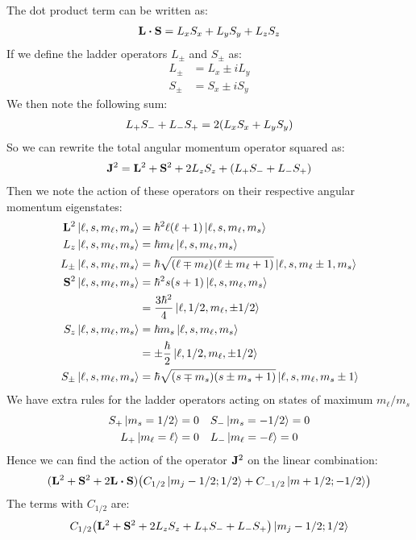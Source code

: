 \documentclass[12pt]{article}
\renewcommand{\l}{\ell}
\begin{document}
The dot product term can be written as:
\begin{align*}
  \vb{L}\vdot\vb{S}=L_xS_x+L_yS_y+L_zS_z
\end{align*}
If we define the ladder operators $L_\pm$ and $S_\pm$ as:
\begin{align*}
  L_\pm&=L_x\pm iL_y\\
  S_\pm&=S_x\pm iS_y
\end{align*}
We then note the following sum:
\begin{align*}
  L_+S_-+L_-S_+=2\qty(L_xS_x+L_yS_y)
\end{align*}
So we can rewrite the total angular momentum operator squared as:
\begin{align*}
  \vb{J}^2=\vb{L}^2+\vb{S}^2+2L_zS_z+\qty(L_+S_-+L_-S_+)
\end{align*}
Then we note the action of these operators on their respective angular momentum eigenstates:
\begin{align*}
  \vb{L}^2\ket{\l,s,m_\l,m_s}&=\hbar^2\l(\l+1)\ket{\l,s,m_\l,m_s}\\
  L_z\ket{\l,s,m_\l,m_s}&=\hbar m_\l\ket{\l,s,m_\l,m_s}\\
  L_\pm\ket{\l,s,m_\l,m_s}&=\hbar
  \sqrt{(\l\mp m_\l)(\l\pm m_\l+1)}\ket{\l,s,m_\l\pm1,m_s}\\
  \vb{S}^2\ket{\l,s,m_\l,m_s}&=\hbar^2s(s+1)\ket{\l,s,m_\l,m_s}\\
  &=\frac{3\hbar^2}4\ket{\l,1/2,m_\l,\pm1/2}\\
  S_z\ket{\l,s,m_\l,m_s}&=\hbar m_s\ket{\l,s,m_\l,m_s}\\
  &=\pm\frac\hbar2\ket{\l,1/2,m_\l,\pm1/2}\\
  S_\pm\ket{\l,s,m_\l,m_s}&=\hbar
  \sqrt{(s\mp m_s)(s\pm m_s+1)}\ket{\l,s,m_\l,m_s\pm1}
\end{align*}
We have extra rules for the ladder operators acting on states of maximum $m_\l/m_s$
\begin{gather*}
  S_+\ket{m_s=1/2}=0\quad S_-\ket{m_s=-1/2}=0\\
  L_+\ket{m_\l=\l}=0\quad L_-\ket{m_\l=-\l}=0
\end{gather*}
Hence we can find the action of the operator $\vb{J}^2$ on the linear combination:
\begin{align*}
  (\vb{L}^2+\vb{S}^2+2\vb{L\vdot S})
  \qty(C_{1/2}\ket{m_j-1/2;1/2}+C_{-1/2}\ket{m+1/2;-1/2})
\end{align*}
The terms with $C_{1/2}$ are:
\begin{align*}
  C_{1/2}\qty(\vb{L}^2+\vb{S}^2+2L_zS_z+L_+S_-+L_-S_+)\ket{m_j-1/2;1/2}
\end{align*}
\end{document}
